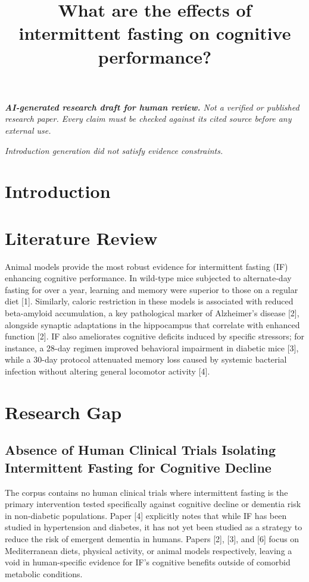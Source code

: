 \documentclass[11pt]{article}
\title{What are the effects of intermittent fasting on cognitive performance?}
\date{}
\begin{document}
\maketitle
\textit{\textbf{AI-generated research draft for human review.} Not a verified or published research paper. Every claim must be checked against its cited source before any external use.}\par

\textit{Introduction generation did not satisfy evidence constraints.}

\section{Introduction}
\section{Literature Review}
Animal models provide the most robust evidence for intermittent fasting (IF) enhancing cognitive performance. In wild-type mice subjected to alternate-day fasting for over a year, learning and memory were superior to those on a regular diet [1]. Similarly, caloric restriction in these models is associated with reduced beta-amyloid accumulation, a key pathological marker of Alzheimer's disease [2], alongside synaptic adaptations in the hippocampus that correlate with enhanced function [2]. IF also ameliorates cognitive deficits induced by specific stressors; for instance, a 28-day regimen improved behavioral impairment in diabetic mice [3], while a 30-day protocol attenuated memory loss caused by systemic bacterial infection without altering general locomotor activity [4].

\section{Research Gap}
\subsection{Absence of Human Clinical Trials Isolating Intermittent Fasting for Cognitive Decline}
The corpus contains no human clinical trials where intermittent fasting is the primary intervention tested specifically against cognitive decline or dementia risk in non-diabetic populations. Paper [4] explicitly notes that while IF has been studied in hypertension and diabetes, it has not yet been studied as a strategy to reduce the risk of emergent dementia in humans. Papers [2], [3], and [6] focus on Mediterranean diets, physical activity, or animal models respectively, leaving a void in human-specific evidence for IF's cognitive benefits outside of comorbid metabolic conditions.
\end{document}

